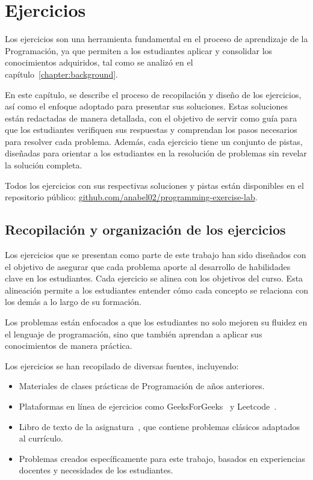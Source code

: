 \chapter{Ejercicios}\label{chapter:exercises}

Los ejercicios son una herramienta fundamental en el proceso de aprendizaje de la Programación, ya que permiten a los estudiantes aplicar y consolidar los conocimientos adquiridos, tal como se analizó en el capítulo~\ref{chapter:background}.

En este capítulo, se describe el proceso de recopilación y diseño de los ejercicios, así como el enfoque adoptado para presentar sus soluciones. Estas soluciones están redactadas de manera detallada, con el objetivo de servir como guía para que los estudiantes verifiquen sus respuestas y comprendan los pasos necesarios para resolver cada problema. Además, cada ejercicio tiene un conjunto de pistas, diseñadas para orientar a los estudiantes en la resolución de problemas sin revelar la solución completa.

Todos los ejercicios con sus respectivas soluciones y pistas están disponibles en el repositorio público: \href{https://github.com/anabel02/programming-exercise-lab}{github.com/anabel02/programming-exercise-lab}.

\section{Recopilación y organización de los ejercicios}\label{sec:exercises}

Los ejercicios que se presentan como parte de este trabajo han sido diseñados con el objetivo de asegurar que cada problema aporte al desarrollo de habilidades clave en los estudiantes. Cada ejercicio se alinea con los objetivos del curso. Esta alineación permite a los estudiantes entender cómo cada concepto se relaciona con los demás a lo largo de su formación.

Los problemas están enfocados a que los estudiantes no solo mejoren su fluidez en el lenguaje de programación, sino que también aprendan a aplicar sus conocimientos de manera práctica.

Los ejercicios se han recopilado de diversas fuentes, incluyendo:
\begin{itemize}
    \item Materiales de clases prácticas de Programación de años anteriores.
    \item Plataformas en línea de ejercicios como GeeksForGeeks~\cite{geeksforgeeks} y Leetcode~\cite{leetcode}.
    \item Libro de texto de la asignatura~\cite{katrib_programar}, que contiene problemas clásicos adaptados al currículo.
    \item Problemas creados específicamente para este trabajo, basados en experiencias docentes y necesidades de los estudiantes.
\end{itemize}

